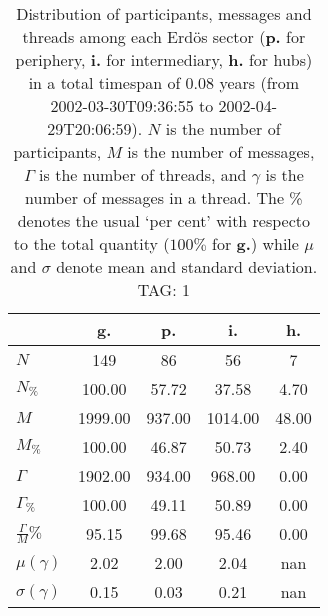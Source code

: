 \begin{table}[h!]
\begin{center}
\begin{tabular}{| l | c | c | c | c |}\hline
 & g. & p. & i. & h. \\\hline
$N$ & 149  & 86  & 56  & 7 \\\hline
$N_{\%}$ & 100.00  & 57.72  & 37.58  & 4.70 \\\hline
$M$ & 1999.00  & 937.00  & 1014.00  & 48.00 \\\hline
$M_{\%}$ & 100.00  & 46.87  & 50.73  & 2.40 \\\hline
$\Gamma$ & 1902.00  & 934.00  & 968.00  & 0.00 \\\hline
$\Gamma_{\%}$ & 100.00  & 49.11  & 50.89  & 0.00 \\\hline
$\frac{\Gamma}{M}\%$ & 95.15  & 99.68  & 95.46  & 0.00 \\\hline
$\mu(\gamma)$ & 2.02  & 2.00  & 2.04  & nan \\\hline
$\sigma(\gamma)$ & 0.15  & 0.03  & 0.21  & nan \\\hline
\end{tabular}
\caption{Distribution of participants, messages and threads among each Erd\"os sector ({\bf p.} for periphery, {\bf i.} for intermediary, 
    {\bf h.} for hubs) in a total timespan of 0.08 years (from 2002-03-30T09:36:55 to 2002-04-29T20:06:59). $N$ is the number of participants, $M$ is the number of messages, $\Gamma$ is the number of threads, and $\gamma$ is the number of messages in a thread.
    The \% denotes the usual `per cent' with respecto to the total quantity ($100\%$ for {\bf g.})
    while $\mu$ and $\sigma$ denote mean and standard deviation. TAG: 1}
\end{center}
\end{table}
